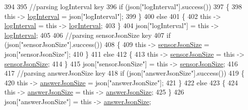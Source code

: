 \begin{DoxyCode}
394 
395             \textcolor{comment}{//parsing logInterval key}
396             \textcolor{keywordflow}{if} (json[\textcolor{stringliteral}{"logInterval"}].success())
397             \{
398                 \textcolor{keyword}{this} -> \hyperlink{classCoolBoard_a4de0096d575d66b472c4c1f0111fd452}{logInterval} = json[\textcolor{stringliteral}{"logInterval"}];
399             \}
400             \textcolor{keywordflow}{else}
401             \{
402                 \textcolor{keyword}{this} -> \hyperlink{classCoolBoard_a4de0096d575d66b472c4c1f0111fd452}{logInterval} = \textcolor{keyword}{this} -> \hyperlink{classCoolBoard_a4de0096d575d66b472c4c1f0111fd452}{logInterval};
403             \}
404             json[\textcolor{stringliteral}{"logInterval"}] = \textcolor{keyword}{this} -> \hyperlink{classCoolBoard_a4de0096d575d66b472c4c1f0111fd452}{logInterval};
405 
406             \textcolor{comment}{//parsing sensorJsonSize key}
407             \textcolor{keywordflow}{if} (json[\textcolor{stringliteral}{"sensorJsonSize"}].success())
408             \{
409                 \textcolor{keyword}{this} -> \hyperlink{classCoolBoard_a58e4b6072e3ac8b141ec0befb479208e}{sensorJsonSize} = json[\textcolor{stringliteral}{"sensorJsonSize"}];
410             \}
411             \textcolor{keywordflow}{else}
412             \{
413                 \textcolor{keyword}{this} -> \hyperlink{classCoolBoard_a58e4b6072e3ac8b141ec0befb479208e}{sensorJsonSize} = \textcolor{keyword}{this} -> \hyperlink{classCoolBoard_a58e4b6072e3ac8b141ec0befb479208e}{sensorJsonSize};
414             \}
415             json[\textcolor{stringliteral}{"sensorJsonSize"}] = \textcolor{keyword}{this} -> \hyperlink{classCoolBoard_a58e4b6072e3ac8b141ec0befb479208e}{sensorJsonSize};
416             
417             \textcolor{comment}{//parsing answerJsonSize key            }
418             \textcolor{keywordflow}{if} (json[\textcolor{stringliteral}{"answerJsonSize"}].success())
419             \{
420                 \textcolor{keyword}{this} -> \hyperlink{classCoolBoard_af2da1f85315b3d074a8b87d158094fb7}{answerJsonSize} = json[\textcolor{stringliteral}{"answerJsonSize"}];
421             \}
422             \textcolor{keywordflow}{else}
423             \{
424                 \textcolor{keyword}{this} -> \hyperlink{classCoolBoard_af2da1f85315b3d074a8b87d158094fb7}{answerJsonSize} = \textcolor{keyword}{this} -> \hyperlink{classCoolBoard_af2da1f85315b3d074a8b87d158094fb7}{answerJsonSize};
425             \}
426             json[\textcolor{stringliteral}{"answerJsonSize"}] = \textcolor{keyword}{this} -> \hyperlink{classCoolBoard_af2da1f85315b3d074a8b87d158094fb7}{answerJsonSize};

\end{DoxyCode}

